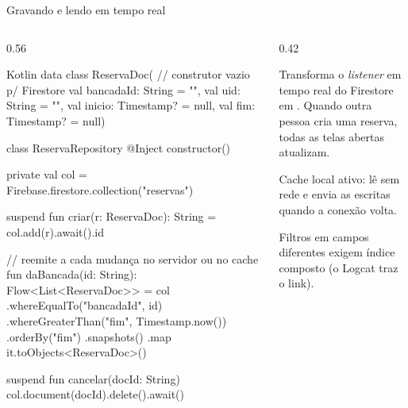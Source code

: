 \documentclass[aspectratio=169,10pt]{beamer}
\begin{document}
\begin{frame}[fragile]{Gravando e lendo em tempo real}
  \begin{columns}[T]
    \begin{column}{0.56\textwidth}
\begin{codigo}[title=ReservaRepository.kt]{Kotlin}
data class ReservaDoc(        // construtor vazio p/ Firestore
  val bancadaId: String = "", val uid: String = "",
  val inicio: Timestamp? = null, val fim: Timestamp? = null)

class ReservaRepository @Inject constructor() {
  private val col = Firebase.firestore.collection("reservas")

  suspend fun criar(r: ReservaDoc): String =
    col.add(r).await().id

  // reemite a cada mudança no servidor ou no cache
  fun daBancada(id: String): Flow<List<ReservaDoc>> = col
    .whereEqualTo("bancadaId", id)
    .whereGreaterThan("fim", Timestamp.now())
    .orderBy("fim")
    .snapshots()
    .map { it.toObjects<ReservaDoc>() }

  suspend fun cancelar(docId: String) {
    col.document(docId).delete().await()
  }
}
\end{codigo}
    \end{column}
    \begin{column}{0.42\textwidth}
      \begin{conceito}
        Transforma o \emph{listener} em tempo real do Firestore em . Quando outra pessoa cria uma reserva, todas as telas abertas atualizam.
      \end{conceito}
      \begin{conceito}[Offline]
        Cache local ativo: lê sem rede e envia as escritas quando a conexão volta.
      \end{conceito}
      \begin{atencao}[Índices]
        Filtros em campos diferentes exigem índice composto (o Logcat traz o link).
      \end{atencao}
    \end{column}
  \end{columns}
\end{frame}
\end{document}
